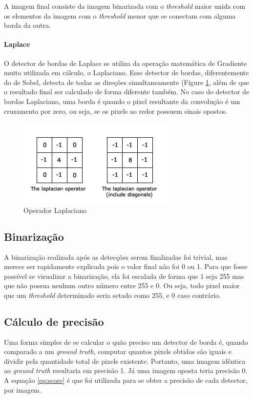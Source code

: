\documentclass[10pt,twocolumn,letterpaper]{article}
\begin{document}
A imagem final consiste da imagem binarizada com o \emph{threshold} maior unida com os elementos da imagem com o \emph{threshold} menor que se conectam com alguma borda da outra.\cite{canny}

\paragraph{Laplace}
O detector de bordas de Laplace se utiliza da operação matemática de Gradiente muito utilizada em cálculo, o Laplaciano. Esse detector de bordas, diferentemente do de Sobel, detecta de todas as direções simultaneamente (Figure \ref{fig:LaplaceKernel}, além de que o resultado final ser calculado de forma diferente também. No caso do detector de bordas Laplaciano, uma borda é quando o pixel resultante da convolução é um cruzamento por zero, ou seja, se os pixels ao redor possuem sinais opostos.\cite{laplace}

\begin{figure}[!htp]
\centering
\includegraphics[width=\columnwidth]{LaplaceKernel}
\caption{Operador Laplaciano}
\label{fig:LaplaceKernel}
\end{figure}

\subsection{Binarização}
A binarização realizada após as detecções serem finalizadas foi trivial, mas merece ser rapidamente explicada pois o valor final não foi 0 ou 1. Para que fosse possível se visualizar a binarização, ela foi escalada de forma que 1 seja 255 mas que não possua nenhum outro número entre 255 e 0. Ou seja, todo pixel maior que um \emph{threshold} determinado seria setado como 255, e 0 caso contrário.

\subsection{Cálculo de precisão}
Uma forma simples de se calcular o quão preciso um detector de borda é, quando comparado a um \emph{ground truth}, computar quantos pixels obtidos são iguais e dividir pela quantidade total de pixels existente. Portanto, uma imagem idêntica ao \emph{ground truth} resultaria em precisão 1. Já uma imagem oposta teria precisão 0. A equação \ref{eq:score} é que foi utilizada para se obter a precisão de cada detector, por imagem.
\end{document}
